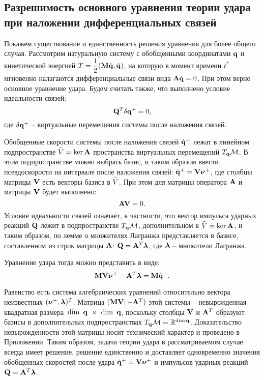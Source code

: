 
\subsection{Разрешимость основного уравнения теории удара при наложении дифференциальных связей}

Покажем существование и единственность решения уравнения для более общего случая.
Рассмотрим натуральную систему с обобщенными координатами $\mathbf{q}$ и кинетической энергией $T = \displaystyle\frac{\displaystyle 1}{\displaystyle 2}(\mathbf{M}\dot{\mathbf{q}}, \dot{\mathbf{q}})$, на которую в момент времени $t^*$ мгновенно налагаются дифференциальные связи вида $\mathbf{A}\dot{\mathbf{q}} = 0$.
При этом верно основное уравнение удара.
Будем считать также, что выполнено условие идеальности связей:
\begin{equation}\label{eq:constraints_ideal}
    \mathbf{Q}^T \delta\mathbf{q}^+ = 0,
\end{equation}
где $\delta\mathbf{q}^+$ -- виртуальные перемещения системы после наложения связей.

Обобщенные скорости системы после наложения связей $\dot{\mathbf{q}}^+$ лежат в линейном подпространстве $\widetilde{V} = \ker \mathbf{A}$ пространства виртуальных перемещений $T_{\mathbf{q}}\mathcal{M}$.
В этом подпространстве можно выбрать базис, и таким образом ввести псевдоскорости на интервале после наложения связей: $\dot{\mathbf{q}}^+ = \mathbf{V}\boldsymbol{\mathbf{\nu}}^+$, где столбцы матрицы $\mathbf{V}$ есть векторы базиса в $\widetilde{V}$.
При этом для матрицы оператора $\mathbf{A}$ и матрицы $\mathbf{V}$ будет выполнено:
\begin{equation}\label{eq:constraints_orth}
    \mathbf{A}\mathbf{V} = 0.
\end{equation}
Условие идеальности связей означает, в частности, что вектор импульса ударных реакций $\mathbf{Q}$ лежит в подпространстве $T_{\mathbf{q}}\mathcal{M}$, дополнительном к $\widetilde{V} = \ker \mathbf{A}$, и таким образом, по лемме о множителях Лагранжа \cite{KarapetyanKugushev2010} представляется в базисе, составленном из строк матрицы $\mathbf{A}$: $\mathbf{Q} = \mathbf{A}^T\boldsymbol{\mathbf{\lambda}}$, где $\boldsymbol{\mathbf{\lambda}}$ -- множители Лагранжа.

Уравнение удара тогда можно представить в виде:
\begin{equation}\label{eq:udar_mat_At}
    \mathbf{M}\mathbf{V}\boldsymbol{\mathbf{\nu}}^+ - \mathbf{A}^T\boldsymbol{\mathbf{\lambda}} = \mathbf{M}\dot{\mathbf{q}}^-.
\end{equation}

Равенство есть система алгебраических уравнений относительно вектора неизвестных $(\boldsymbol{\mathbf{\nu}}^+, \boldsymbol{\mathbf{\lambda}})^T$. Матрица $(\mathbf{M}\mathbf{V}; -\mathbf{A}^T)$ этой системы -- невырожденная квадратная размера~$\dim~\mathbf{q}~\times~\dim~\mathbf{q}$, поскольку столбцы $\mathbf{V}$ и $\mathbf{A}^T$ образуют базисы в дополнительных подпространствах $T_{\mathbf{q}}\mathcal{M} = \mathbb{R}^{\dim \mathbf{q}}$. Доказательство невырожденности этой матрицы носит технический характер и проведено в Приложении. Таким образом, задача теории удара в рассматриваемом случае всегда имеет решение, решение единственно и доставляет одновременно значения обобщенных скоростей после удара $\dot{\mathbf{q}}^+ = \mathbf{V}\boldsymbol{\mathbf{\nu}}^+$ и импульсов ударных реакций~$\mathbf{Q} = \mathbf{A}^T\boldsymbol{\mathbf{\lambda}}$.

